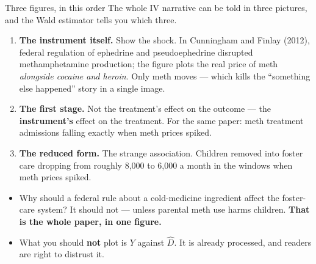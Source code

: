 \documentclass[
  11pt,
  ignorenonframetext,
  aspectratio=169,
]{beamer}
\providecommand{\tightlist}{%
  \setlength{\itemsep}{0pt}\setlength{\parskip}{0pt}}
\begin{document}
\begin{frame}{Three figures, in this order}
\protect{}\label{three-figures-in-this-order}
The whole IV narrative can be told in three pictures, and the Wald
estimator tells you which three.

\begin{enumerate}
\tightlist
\item
  \textbf{The instrument itself.} Show the shock. In Cunningham and
  Finlay (2012), federal regulation of ephedrine and pseudoephedrine
  disrupted methamphetamine production; the figure plots the real price
  of meth \emph{alongside cocaine and heroin}. Only meth moves --- which
  kills the ``something else happened'' story in a single image.
\item
  \textbf{The first stage.} Not the treatment's effect on the outcome
  --- the \textbf{instrument's} effect on the treatment. For the same
  paper: meth treatment admissions falling exactly when meth prices
  spiked.
\item
  \textbf{The reduced form.} The strange association. Children removed
  into foster care dropping from roughly 8,000 to 6,000 a month in the
  windows when meth prices spiked.
\end{enumerate}

\vspace{0.3em}

\begin{itemize}
\tightlist
\item
  Why should a federal rule about a cold-medicine ingredient affect the
  foster-care system? It should not --- unless parental meth use harms
  children. \textbf{That is the whole paper, in one figure.}
\item
  What you should \textbf{not} plot is \(Y\) against \(\hat D\). It is
  already processed, and readers are right to distrust it.
\end{itemize}
\end{frame}
\end{document}

